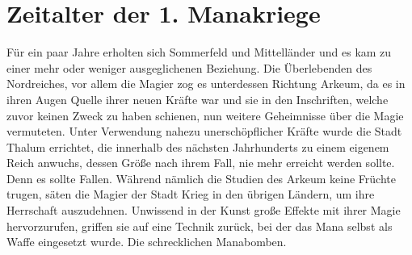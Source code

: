 \documentclass[a4paper,12pt,oneside]{book}
\begin{document}
\chapter{Zeitalter der 1. Manakriege}
Für ein paar Jahre erholten sich Sommerfeld und Mittelländer und es kam zu einer mehr oder weniger ausgeglichenen Beziehung. Die Überlebenden des Nordreiches, vor allem die Magier zog es unterdessen Richtung Arkeum, da es in ihren Augen Quelle ihrer neuen Kräfte war und sie in den Inschriften, welche zuvor keinen Zweck zu haben schienen, nun weitere Geheimnisse über die Magie vermuteten. Unter Verwendung nahezu unerschöpflicher Kräfte wurde die Stadt Thalum errichtet, die innerhalb des nächsten Jahrhunderts zu einem eigenem Reich anwuchs, dessen Größe nach ihrem Fall, nie mehr erreicht werden sollte. Denn es sollte Fallen. Während nämlich die Studien des Arkeum keine Früchte trugen, säten die Magier der Stadt Krieg in den übrigen Ländern, um ihre Herrschaft auszudehnen. Unwissend in der Kunst große Effekte mit ihrer Magie hervorzurufen, griffen sie auf eine Technik zurück, bei der das Mana selbst als Waffe eingesetzt wurde. Die schrecklichen Manabomben. 
\end{document}
